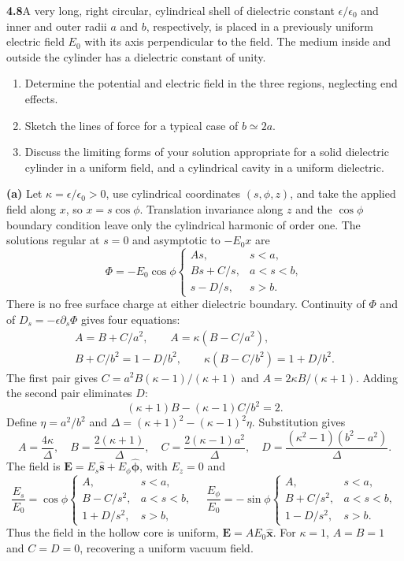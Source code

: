 \par\bigskip
\noindent\textbf{4.8}\quad A very long, right circular, cylindrical shell of dielectric constant $\epsilon/\epsilon_{0}$ and inner and outer radii $a$ and $b$, respectively, is placed in a previously uniform electric field $E_{0}$ with its axis perpendicular to the field. The medium inside and outside the cylinder has a dielectric constant of unity.
\begin{enumerate}
\item[(a)] Determine the potential and electric field in the three regions, neglecting end effects.
\item[(b)] Sketch the lines of force for a typical case of $b\simeq2a$.
\item[(c)] Discuss the limiting forms of your solution appropriate for a solid dielectric cylinder in a uniform field, and a cylindrical cavity in a uniform dielectric.
\end{enumerate}
\solution

\textbf{(a)} Let $\kappa=\epsilon/\epsilon_0>0$, use cylindrical
coordinates $(s,\phi,z)$, and take the applied field along $x$, so
$x=s\cos\phi$. Translation invariance along $z$ and the $\cos\phi$
boundary condition leave only the cylindrical harmonic of order one.
The solutions regular at $s=0$ and asymptotic to $-E_0x$ are
\[
\Phi=-E_0\cos\phi\begin{cases}
As,&s<a,\\
Bs+C/s,&a<s<b,\\
s-D/s,&s>b.
\end{cases}
\]
There is no free surface charge at either dielectric boundary. Continuity
of $\Phi$ and of $D_s=-\epsilon\partial_s\Phi$ gives four equations:
\begin{gather*}
A=B+C/a^2,\qquad A=\kappa(B-C/a^2),\\
B+C/b^2=1-D/b^2,\qquad
\kappa(B-C/b^2)=1+D/b^2.
\end{gather*}
The first pair gives
$C=a^2B(\kappa-1)/(\kappa+1)$ and
$A=2\kappa B/(\kappa+1)$. Adding the second pair eliminates $D$:
\[
(\kappa+1)B-(\kappa-1)C/b^2=2.
\]
Define $\eta=a^2/b^2$ and
$\Delta=(\kappa+1)^2-(\kappa-1)^2\eta$. Substitution gives
\[
\boxed{A=\frac{4\kappa}{\Delta},\quad
B=\frac{2(\kappa+1)}{\Delta},\quad
C=\frac{2(\kappa-1)a^2}{\Delta},\quad
D=\frac{(\kappa^2-1)(b^2-a^2)}{\Delta}.}
\]
The field is $\mathbf E=E_s\hat{\mathbf s}+E_\phi\hat{\boldsymbol\phi}$,
with $E_z=0$ and
\[
\boxed{\frac{E_s}{E_0}=\cos\phi\begin{cases}
A,&s<a,\\ B-C/s^2,&a<s<b,\\1+D/s^2,&s>b,
\end{cases}\quad
\frac{E_\phi}{E_0}=-\sin\phi\begin{cases}
A,&s<a,\\B+C/s^2,&a<s<b,\\1-D/s^2,&s>b.
\end{cases}}
\]
Thus the field in the hollow core is uniform, $\mathbf E=AE_0\hat{\mathbf x}$.
For $\kappa=1$, $A=B=1$ and $C=D=0$, recovering a uniform vacuum field.

